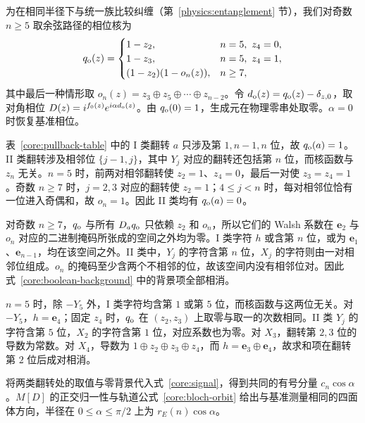 为在相同半径下与统一族比较纠缠（第~\ref{physics:entanglement} 节），我们对奇数 $n\ge5$ 取余弦路径的相位核为
\begin{equation}
 q_{\rm o}(z)=\begin{cases}
  1-z_2,& n=5,\ z_4=0,\\
  1-z_3,& n=5,\ z_4=1,\\
  (1-z_2)(1-o_n(z)),& n\ge7,
 \end{cases}
 \label{core:odd-cosine-kernel}
\end{equation}
其中最后一种情形取 $o_n(z)=z_3\oplus z_5\oplus\cdots\oplus z_{n-2}$。令 $d_{\rm o}(z)=q_{\rm o}(z)-\delta_{z,0}$，取对角相位 $D(z)=i^{f_0(z)}e^{i\alpha d_{\rm o}(z)}$。由 $q_{\rm o}(0)=1$，生成元在物理零串处取零。$\alpha=0$ 时恢复基准相位。

表~\ref{core:pullback-table} 中的 I 类翻转 $a$ 只涉及第 $1,n-1,n$ 位，故 $q_{\rm o}(a)=1$。II 类翻转涉及相邻位 $\{j-1,j\}$，其中 $Y_j$ 对应的翻转还包括第 $n$ 位，而核函数与 $z_n$ 无关。$n=5$ 时，前两对相邻翻转使 $z_2=1$、$z_4=0$，最后一对使 $z_3=z_4=1$。奇数 $n\ge7$ 时，$j=2,3$ 对应的翻转使 $z_2=1$；$4\le j<n$ 时，每对相邻位恰有一位进入奇偶和，故 $o_n=1$。因此 II 类均有 $q_{\rm o}(a)=0$。

对奇数 $n\ge7$，$q_{\rm o}$ 与所有 $D_aq_{\rm o}$ 只依赖 $z_2$ 和 $o_n$，所以它们的 Walsh 系数在 $\mathbf e_2$ 与 $o_n$ 对应的二进制掩码所张成的空间之外均为零。I 类字符 $h$ 或含第 $n$ 位，或为 $\mathbf e_1$、$\mathbf e_{n-1}$，均在该空间之外。II 类中，$Y_j$ 的字符含第 $n$ 位，$X_j$ 的字符则由一对相邻位组成。$o_n$ 的掩码至少含两个不相邻的位，故该空间内没有相邻位对。因此式~\eqref{core:boolean-background} 中的背景项全部相消。

$n=5$ 时，除 $-Y_5$ 外，I 类字符均含第 $1$ 或第 $5$ 位，而核函数与这两位无关。对 $-Y_5$，$h=\mathbf e_4$；固定 $z_4$ 时，$q_{\rm o}$ 在 $(z_2,z_3)$ 上取零与取一的次数相同。II 类 $Y_j$ 的字符含第 $5$ 位，$X_2$ 的字符含第 $1$ 位，对应系数也为零。对 $X_3$，翻转第 $2,3$ 位的导数为常数。对 $X_4$，导数为 $1\oplus z_2\oplus z_3\oplus z_4$，而 $h=\mathbf e_3\oplus\mathbf e_4$，故求和项在翻转第 $2$ 位后成对相消。

将两类翻转处的取值与零背景代入式~\eqref{core:signal}，得到共同的有号分量 $c_n\cos\alpha$。$M[D]$ 的正交归一性与轨道公式~\eqref{core:bloch-orbit} 给出与基准测量相同的四面体方向，半径在 $0\le\alpha\le\pi/2$ 上为 $r_E(n)\cos\alpha$。
